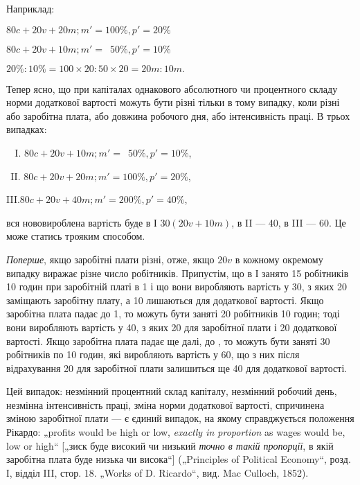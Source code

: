 
Наприклад:
\begin{center}
$80 c + 20 v + 20 m; m' = 100\%, p' = 20\%$

$80 c + 20 v + 10 m; m' = \phantom{0}50\%, p' = 10\%$

$20\%:10\% = 100×20:50×20 = 20 m:10 m.$
\end{center}

Тепер ясно, що при капіталах однакового абсолютного чи
процентного складу норми додаткової вартості можуть бути
різні тільки в тому випадку, коли різні або заробітна плата,
або довжина робочого дня, або інтенсивність праці. В трьох
випадках:
\begin{center}
$\phantom{II}$I. $80 c + 20 v + 10 m; m' = \phantom{0}50\%, p' = 10\%$,

$\phantom{I}$II. $80 c + 20 v + 20 m; m' = 100\%, p' = 20\%$,

III.$80 c + 20 v + 40 m; m' = 200\%, p' = 40\%$,
\end{center}
вся нововироблена вартість буде в І $30 (20 v + 10 m)$, в II — 40,
в III — 60. Це може статись трояким способом.

\emph{Поперше}, якщо заробітні плати різні, отже, якщо $20 v$ в кожному
окремому випадку виражає різне число робітників. Припустім,
що в І занято 15 робітників 10 годин при заробітній
платі в 1 і що вони виробляють вартість
у 30, з яких 20 заміщають
заробітну плату, а 10 лишаються для додаткової
вартості. Якщо заробітна плата падає до 1,
то можуть бути заняті 20 робітників 10 годин; тоді вони
виробляють вартість у 40, з яких 20 для заробітної плати і 20 додаткової
вартості. Якщо заробітна плата падає ще далі, до , то можуть бути заняті 30 робітників по 10 годин,
які виробляють вартість у 60, що з них після
відрахування 20 для заробітної плати залишиться
ще 40 для додаткової вартості.

Цей випадок: незмінний процентний склад капіталу, незмінний
робочий день, незмінна інтенсивність праці, зміна норми
додаткової вартості, спричинена зміною заробітної плати — є
єдиний випадок, на якому справджується положення Рікардо:
„profits would be high or low, \emph{exactly in proportion} as wages
would be, low or high“ [„зиск буде високий чи низький \emph{точно
в такій пропорції}, в якій заробітна плата буде низька чи висока“]
(„Principles of Political Economy“, розд. І, відділ III, стор. 18.
„Works of D. Ricardo“, вид. Mac Culloch, 1852).

